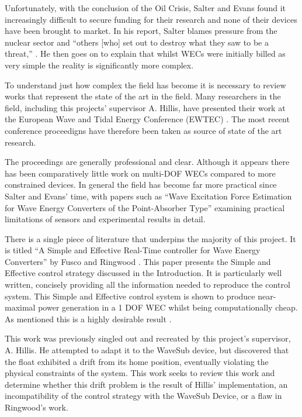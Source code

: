 \documentclass{report}
\begin{document}
Unfortunately, with the conclusion of the Oil Crisis, Salter and Evans found it increasingly difficult to secure funding for their research and none of their devices have been brought to market. In his report, Salter blames pressure from the nuclear sector and ``others [who] set out to destroy what they saw to be a threat,'' \cite{salterRamble}. He then goes on to explain that whilst WECs were initially billed as very simple the reality is significantly more complex.

To understand just how complex the field has become it is necessary to review works that represent the state of the art in the field. Many researchers in the field, including this projects' supervisor A. Hillis, have presented their work at the European Wave and Tidal Energy Conference (EWTEC) \cite{andyMPC}\cite{andyModelErrors}\cite{nguyen2018a}\cite{abdelkhalik2017a}. The most recent conference proceedigns have therefore been taken as source of state of the art research\cite{EWTEC}.

The proceedings are generally professional and clear. Although it appears there has been comparatively little work on multi-DOF WECs compared to more constrained devices. In general the field has become far more practical since Salter and Evans' time, with papers such as ``Wave Excitation Force Estimation for Wave Energy Converters of the Point-Absorber Type'' \cite{nguyen2018a} examining practical limitations of sensors and experimental results in detail.

There is a single piece of literature that underpins the majority of this project. It is titled ``A Simple and Effective Real-Time controller for Wave Energy Converters'' by Fusco and Ringwood \cite{ringwood}. This paper presents the Simple and Effective control strategy discussed in the Introduction. It is particularly well written, concisely providing all the information needed to reproduce the control system. This Simple and Effective control system is shown to produce near-maximal power generation in a 1 DOF WEC whilst being computationally cheap. As mentioned this is a highly desirable result \cite{carbonTrust}.

This work was previously singled out and recreated by this project's supervisor, A. Hillis. He attempted to adapt it to the WaveSub device, but discovered that the float exhibited a drift from its home position, eventually violating the physical constraints of the system. This work seeks to review this work and determine whether this drift problem is the result of Hillis' implementation, an incompatibility of the control strategy with the WaveSub Device, or a flaw in Ringwood's work.
\end{document}
